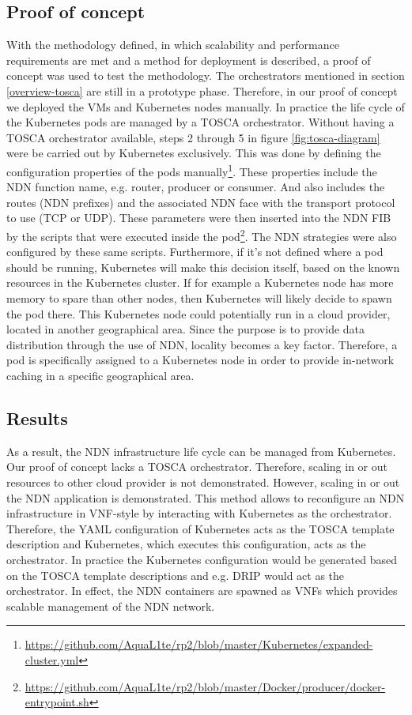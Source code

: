 \subsection{Proof of concept}
\label{planning-poc}
With the methodology defined, in which scalability and performance requirements are met and a method for deployment is described, a proof of concept was used to test the methodology. The orchestrators mentioned in section \ref{overview-tosca} are still in a prototype phase. Therefore, in our proof of concept we deployed the VMs and Kubernetes nodes manually. In practice the life cycle of the Kubernetes pods are managed by a TOSCA orchestrator. Without having a TOSCA orchestrator available, steps 2 through 5 in figure \ref{fig:tosca-diagram} were be carried out by Kubernetes exclusively. This was done by defining the configuration properties of the pods manually\footnote{\url{https://github.com/AquaL1te/rp2/blob/master/Kubernetes/expanded-cluster.yml}}. These properties include the NDN function name, e.g. router, producer or consumer. And also includes the routes (NDN prefixes) and the associated NDN face with the transport protocol to use (TCP or UDP). These parameters were then inserted into the NDN FIB by the scripts that were executed inside the pod\footnote{\url{https://github.com/AquaL1te/rp2/blob/master/Docker/producer/docker-entrypoint.sh}}. The NDN strategies were also configured by these same scripts. Furthermore, if it's not defined where a pod should be running, Kubernetes will make this decision itself, based on the known resources in the Kubernetes cluster. If for example a Kubernetes node has more memory to spare than other nodes, then Kubernetes will likely decide to spawn the pod there. This Kubernetes node could potentially run in a cloud provider, located in another geographical area. Since the purpose is to provide data distribution through the use of NDN, locality becomes a key factor. Therefore, a pod is specifically assigned to a Kubernetes node in order to provide in-network caching in a specific geographical area.

\subsection{Results}
As a result, the NDN infrastructure life cycle can be managed from Kubernetes. Our proof of concept lacks a TOSCA orchestrator. Therefore, scaling in or out resources to other cloud provider is not demonstrated. However, scaling in or out the NDN application is demonstrated. This method allows to reconfigure an NDN infrastructure in VNF-style by interacting with Kubernetes as the orchestrator. Therefore, the YAML configuration of Kubernetes acts as the TOSCA template description and Kubernetes, which executes this configuration, acts as the orchestrator. In practice the Kubernetes configuration would be generated based on the TOSCA template descriptions and e.g. DRIP would act as the orchestrator. In effect, the NDN containers are spawned as VNFs which provides scalable management of the NDN network.